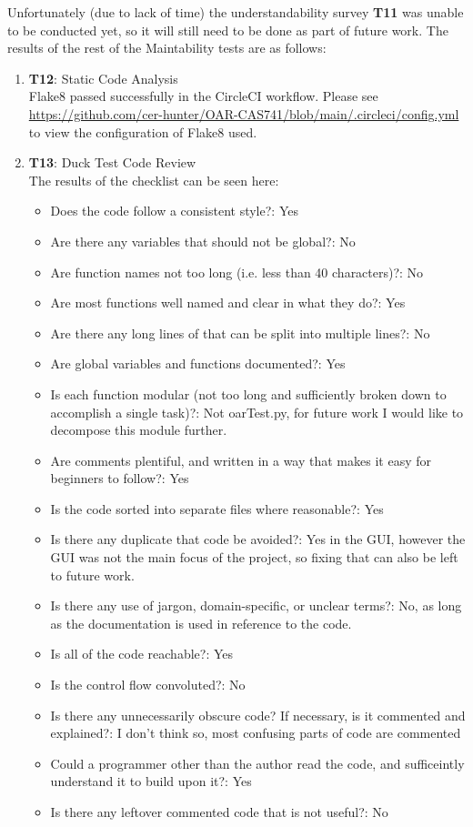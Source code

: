 \documentclass[12pt, titlepage]{article}
\begin{document}
Unfortunately (due to lack of time) the understandability survey \textbf{T11} was unable to be conducted yet, so it will still need to be done as part of future work.
The results of the rest of the Maintability tests are as follows:
\begin{enumerate}
  \item{\textbf{T12}: Static Code Analysis}\\
  Flake8 passed successfully in the CircleCI workflow. Please see \url{https://github.com/cer-hunter/OAR-CAS741/blob/main/.circleci/config.yml} to view the configuration of Flake8 used.
  \item{\textbf{T13}: Duck Test Code Review}\\
  The results of the checklist can be seen here:

  \begin{itemize}
    \item{Does the code follow a consistent style?: Yes}
    \item{Are there any variables that should not be global?: No}
    \item{Are function names not too long (i.e. less than 40 characters)?: No}
    \item{Are most functions well named and clear in what they do?: Yes}
    \item{Are there any long lines of that can be split into multiple lines?: No}
    \item{Are global variables and functions documented?: Yes}
    \item{Is each function modular (not too long and sufficiently broken down to accomplish a single task)?: Not oarTest.py, for future work I would like to decompose this module further.}
    \item{Are comments plentiful, and written in a way that makes it easy for beginners to follow?: Yes}
    \item{Is the code sorted into separate files where reasonable?: Yes}
    \item{Is there any duplicate that code be avoided?: Yes in the GUI, however the GUI was not the main focus of the project, so fixing that can also be left to future work.}
    \item{Is there any use of jargon, domain-specific, or unclear terms?: No, as long as the documentation is used in reference to the code.}
    \item{Is all of the code reachable?: Yes}
    \item{Is the control flow convoluted?: No}
    \item{Is there any unnecessarily obscure code? If necessary, is it commented and explained?: I don't think so, most confusing parts of code are commented}
    \item{Could a programmer other than the author read the code, and sufficeintly understand it to build upon it?: Yes}
    \item{Is there any leftover commented code that is not useful?: No}
  \end{itemize}

\end{enumerate}
\end{document}
